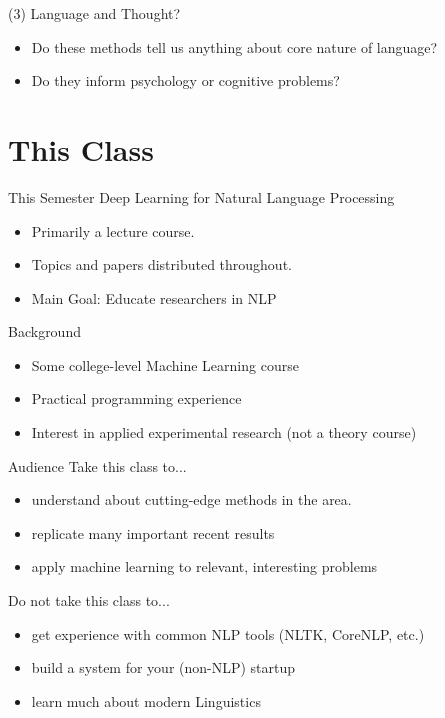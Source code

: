 \documentclass{beamer}
\begin{document}
\begin{frame}{(3) Language and Thought?}
  \begin{itemize}
  \item Do these methods tell us anything about core nature of language?
    \air 

  \item Do they inform psychology or cognitive problems?
  \end{itemize}
\end{frame}

\section{This Class}

\begin{frame}{This Semester}
  Deep Learning for Natural Language Processing

  \begin{itemize}
  \item Primarily a lecture course. 
    \air 

  \item Topics and papers distributed throughout.
    \air

  \item Main Goal: Educate researchers in NLP
  \end{itemize}
\end{frame}

\begin{frame}{Background}
  \begin{itemize}
  \item Some college-level Machine Learning course
  \item Practical programming experience
  \item Interest in applied experimental research (not a theory course)
  \end{itemize}
\end{frame}

\begin{frame}{Audience}
  Take this class to...
  \begin{itemize}
  \item understand about cutting-edge methods in the area. 
  \item replicate many important recent results 
  \item apply machine learning to relevant, interesting problems
  \end{itemize}
  \pause 

  Do not take this class to...
  \begin{itemize}
  \item get experience with common NLP tools (NLTK, CoreNLP, etc.)
  \item build a system for your (non-NLP) startup
  \item learn much about modern Linguistics
  \end{itemize}
\end{frame}
\end{document}
